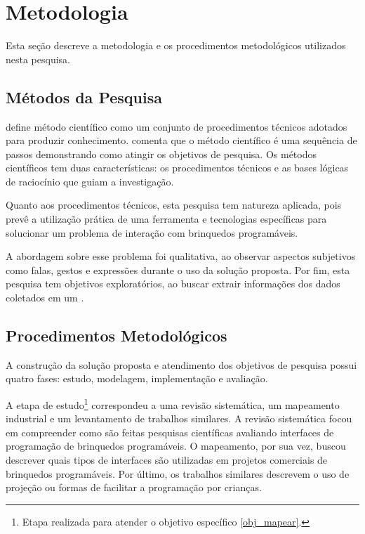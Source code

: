 \section{Metodologia}
\label{s_cintro_metodologia}

Esta seção descreve a metodologia e os procedimentos metodológicos utilizados nesta pesquisa.

\subsection{Métodos da Pesquisa}
\label{ss_cintro_metod_pesquisa}

 define método científico como um conjunto de procedimentos técnicos adotados para produzir conhecimento.  comenta que o método científico é uma sequência de passos demonstrando como atingir os objetivos de pesquisa. Os métodos científicos tem duas características: os procedimentos técnicos e as bases lógicas de raciocínio que guiam a investigação.

Quanto aos procedimentos técnicos, esta pesquisa tem natureza aplicada, pois prevê a utilização prática de uma ferramenta e tecnologias específicas para solucionar um problema de interação com brinquedos programáveis.

A abordagem sobre esse problema foi qualitativa, ao observar aspectos subjetivos como falas, gestos e expressões durante o uso da solução proposta. Por fim, esta pesquisa tem objetivos exploratórios, ao buscar extrair informações dos dados coletados em um .

\subsection{Procedimentos Metodológicos}
\label{ss_cintro_proced_metodologicos}

A construção da solução proposta e atendimento dos objetivos de pesquisa possui quatro fases: estudo, modelagem, implementação e avaliação.

A etapa de estudo\footnote{Etapa realizada para atender o objetivo específico \autoref{obj_mapear}. } correspondeu a uma revisão sistemática, um mapeamento industrial e um levantamento de trabalhos similares. A revisão sistemática focou em compreender como são feitas pesquisas científicas avaliando interfaces de programação de brinquedos programáveis. O mapeamento, por sua vez, buscou descrever quais tipos de interfaces são utilizadas em projetos comerciais de brinquedos programáveis. Por último, os trabalhos similares descrevem o uso de projeção ou formas de facilitar a programação por crianças.

